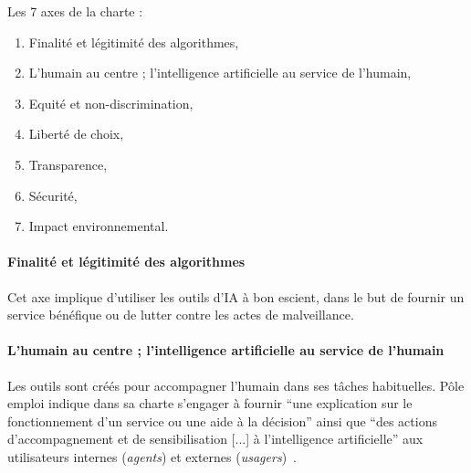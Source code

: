 Les 7 axes de la charte :
\begin{enumerate}
    \item Finalité et légitimité des algorithmes,
    \item L’humain au centre ; l’intelligence artificielle au service de l’humain,
    \item Equité et non-discrimination,
    \item Liberté de choix,
    \item Transparence,
    \item Sécurité,
    \item Impact environnemental.
\end{enumerate}

\paragraph{Finalité et légitimité des algorithmes}
Cet axe implique d'utiliser les outils d'IA à bon escient, dans le but de fournir un service bénéfique ou de lutter contre les actes de malveillance.

\paragraph{L’humain au centre ; l’intelligence artificielle au service de l’humain}
Les outils sont créés pour accompagner l'humain dans ses tâches habituelles. Pôle emploi indique dans sa charte s'engager à fournir ``une explication sur le fonctionnement d'un service ou une aide à la décision'' ainsi que ``des actions d'accompagnement et de sensibilisation [...] à l'intelligence artificielle'' aux utilisateurs internes (\textit{agents}) et externes (\textit{usagers})~\cite{Pole2022}.

